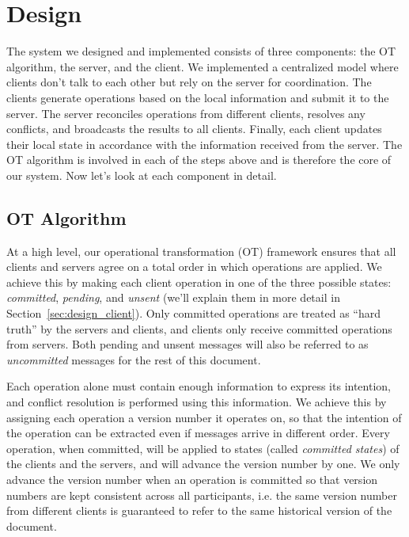 \section{Design}

The system we designed and implemented consists of three components: the OT
algorithm, the server, and the client. We implemented a centralized model where
clients don't talk to each other but rely on the server for coordination. The
clients generate operations based on the local information and submit it to the
server. The server reconciles operations from different clients, resolves any
conflicts, and broadcasts the results to all clients. Finally, each client
updates their local state in accordance with the information received from the
server. The OT algorithm is involved in each of the steps above and is therefore
the core of our system. Now let's look at each component in detail.

\subsection{OT Algorithm}
\label{sec:design_alg}

At a high level, our operational transformation (OT) framework ensures that all
clients and servers agree on a total order in which operations are applied. We
achieve this by making each client operation in one of the three possible
states: {\em committed}, {\em pending}, and {\em unsent} (we'll explain them in
more detail in Section~\ref{sec:design_client}). Only committed operations are
treated as ``hard truth'' by the servers and clients, and clients only receive
committed operations from servers. Both pending and unsent messages will also be
referred to as {\em uncommitted} messages for the rest of this document.

Each operation alone must contain enough information to express its intention,
and conflict resolution is performed using this information. We achieve this by
assigning each operation a version number it operates on, so that the intention
of the operation can be extracted even if messages arrive in different order.
Every operation, when committed, will be applied to states (called {\em
committed states}) of the clients and the servers, and will advance the version
number by one. We only advance the version number when an operation is committed
so that version numbers are kept consistent across all participants, i.e. the
same version number from different clients is guaranteed to refer to the same
historical version of the document.

